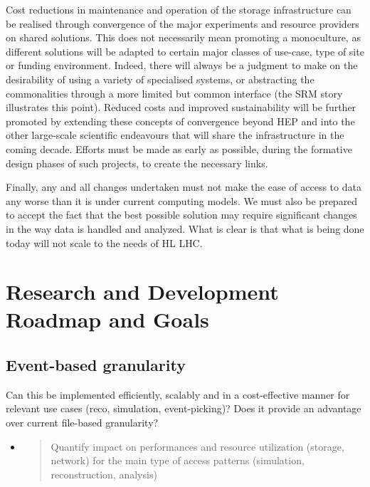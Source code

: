 \documentclass[12pt,a4paper]{article}
\begin{document}
Cost reductions in maintenance and operation of the storage
infrastructure can be realised through convergence of the major
experiments and resource providers on shared solutions. This does not
necessarily mean promoting a monoculture, as different solutions will be
adapted to certain major classes of use-case, type of site or funding
environment. Indeed, there will always be a judgment to make on the
desirability of using a variety of specialised systems, or abstracting
the commonalities through a more limited but common interface (the SRM
story illustrates this point). Reduced costs and improved sustainability
will be further promoted by extending these concepts of convergence
beyond HEP and into the other large-scale scientific endeavours that
will share the infrastructure in the coming decade. Efforts must be made
as early as possible, during the formative design phases of such
projects, to create the necessary links.

Finally, any and all changes undertaken must not make the ease of access
to data any worse than it is under current computing models. We must
also be prepared to accept the fact that the best possible solution may
require significant changes in the way data is handled and analyzed.
What is clear is that what is being done today will not scale to the
needs of HL LHC.

\section{Research and Development Roadmap and
Goals}\label{research-and-development-roadmap-and-goals}

\subsection{Event-based granularity}\label{event-based-granularity}
Can this be implemented efficiently, scalably and in a cost-effective manner
for relevant use cases (reco, simulation, event-picking)? Does it
provide an advantage over current file-based granularity?

\begin{itemize}
\item
  \begin{quote}
  \protect\hypertarget{_xbbh0qorjpnn}{}{}Quantify impact on performances
  and resource utilization (storage, network) for the main type of
  access patterns (simulation, reconstruction, analysis)
  \end{quote}
\end{itemize}
\end{document}
